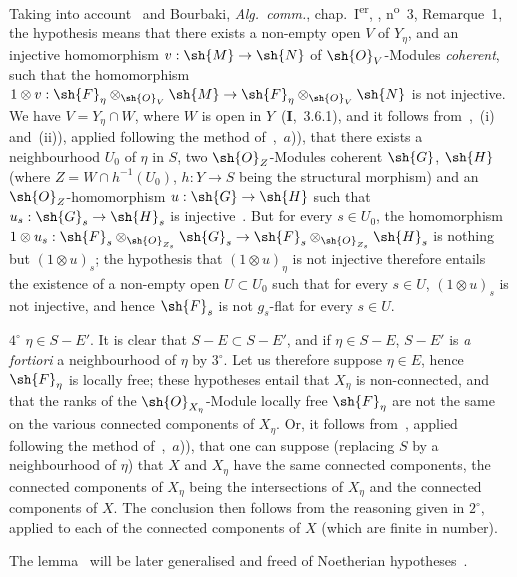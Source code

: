 Taking into account~ and Bourbaki, \emph{Alg.\ comm.}, chap.~I\textsuperscript{er}, , n\textsuperscript{o}~3, Remarque~1, the hypothesis means that there exists a non-empty open $V$ of $Y_\eta$, and an injective homomorphism $v:\sh{M}\to\sh{N}$ of $\sh{O}_V$-Modules \emph{coherent}, such that the homomorphism $1\otimes v:\sh{F}_\eta\otimes_{\sh{O}_V}\sh{M}\to\sh{F}_\eta\otimes_{\sh{O}_V}\sh{N}$ is not injective.
We have $V=Y_\eta\cap W$, where $W$ is open in $Y$~(\textbf{I},~3.6.1), and it follows from~,~(i) and~(ii)), applied following the method of~,~$a$)), that there exists a neighbourhood $U_0$ of $\eta$ in $S$, two $\sh{O}_Z$-Modules
coherent $\sh{G}$, $\sh{H}$ (where $Z=W\cap h^{-1}(U_0)$, $h:Y\to S$ being the structural morphism) and an $\sh{O}_Z$-homomorphism $u:\sh{G}\to\sh{H}$ such that $u_s:\sh{G}_s\to\sh{H}_s$ is injective~.
But for every $s\in U_0$, the homomorphism $1\otimes u_s:\sh{F}_s\otimes_{\sh{O}_{Z_s}}\sh{G}_s\to\sh{F}_s\otimes_{\sh{O}_{Z_s}}\sh{H}_s$ is nothing but $(1\otimes u)_s$; the hypothesis that $(1\otimes u)_\eta$ is not injective therefore entails~ the existence of a non-empty open $U\subset U_0$ such that for every $s\in U$, $(1\otimes u)_s$ is not injective, and hence $\sh{F}_s$ is not $g_s$-flat for every $s\in U$.

$4^\circ$ $\eta\in S-E'$.
It is clear that $S-E\subset S-E'$, and if $\eta\in S-E$, $S-E'$ is \emph{a fortiori} a neighbourhood of $\eta$ by $3^\circ$.
Let us therefore suppose $\eta\in E$, hence $\sh{F}_\eta$ is locally free; these hypotheses entail that $X_\eta$ is non-connected, and that the ranks of the $\sh{O}_{X_\eta}$-Module locally free $\sh{F}_\eta$ are not the same on the various connected components of $X_\eta$.
Or, it follows from~, applied following the method of~,~$a$)), that one can suppose (replacing $S$ by a neighbourhood of $\eta$) that $X$ and $X_\eta$ have the same connected components, the connected components of $X_\eta$ being the intersections of $X_\eta$ and the connected components of $X$.
The conclusion then follows from the reasoning given in $2^\circ$, applied to each of the connected components of $X$ (which are finite in number).

\begin{remark}[9.4.7.2]
\label{IV.9.4.7.2}
The lemma~ will be later generalised and freed of Noetherian hypotheses~.
\end{remark}

